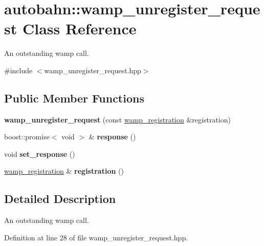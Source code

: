 \hypertarget{classautobahn_1_1wamp__unregister__request}{}\section{autobahn\+:\+:wamp\+\_\+unregister\+\_\+request Class Reference}
\label{classautobahn_1_1wamp__unregister__request}


An outstanding wamp call.  




{\ttfamily \#include $<$wamp\+\_\+unregister\+\_\+request.\+hpp$>$}

\subsection*{Public Member Functions}
\begin{DoxyCompactItemize}
\item 
{\bfseries wamp\+\_\+unregister\+\_\+request} (const \hyperlink{classautobahn_1_1wamp__registration}{wamp\+\_\+registration} \&registration)\hypertarget{classautobahn_1_1wamp__unregister__request_a428106faf3ac86f39579acca1343abe8}{}\label{classautobahn_1_1wamp__unregister__request_a428106faf3ac86f39579acca1343abe8}

\item 
boost\+::promise$<$ void $>$ \& {\bfseries response} ()\hypertarget{classautobahn_1_1wamp__unregister__request_aec77f37a846254834c5308f202e318e3}{}\label{classautobahn_1_1wamp__unregister__request_aec77f37a846254834c5308f202e318e3}

\item 
void {\bfseries set\+\_\+response} ()\hypertarget{classautobahn_1_1wamp__unregister__request_a0dde0b0c00f16796b070f91939f18d85}{}\label{classautobahn_1_1wamp__unregister__request_a0dde0b0c00f16796b070f91939f18d85}

\item 
\hyperlink{classautobahn_1_1wamp__registration}{wamp\+\_\+registration} \& {\bfseries registration} ()\hypertarget{classautobahn_1_1wamp__unregister__request_a359e24de936a52703e08ed1a9b708113}{}\label{classautobahn_1_1wamp__unregister__request_a359e24de936a52703e08ed1a9b708113}

\end{DoxyCompactItemize}


\subsection{Detailed Description}
An outstanding wamp call. 

Definition at line 28 of file wamp\+\_\+unregister\+\_\+request.\+hpp.

